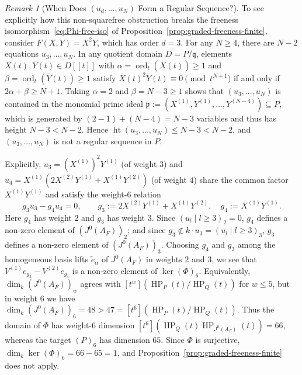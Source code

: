 \documentclass[a4paper, 12pt]{amsart}
\theoremstyle{remark}
\newtheorem{remark}[theorem]{Remark}
\begin{document}
\begin{remark}[When Does $(u_d, \dots, u_N)$ Form a Regular Sequence?]
To see explicitly how this non-squarefree obstruction breaks the freeness isomorphism~\eqref{eq:Phi-free-iso} of Proposition~\ref{prop:graded-freeness-finite},
consider $F(X, Y) = X^2 Y$,
which has order $d = 3$.
For any $N \ge 4$,
there are $N - 2$ equations $u_3, \dots, u_N$.
In any quotient domain $D = P / \mathfrak{q}$,
elements $\overline{X}(t), \overline{Y}(t) \in D[[t]]$ with $\alpha = \operatorname{ord}_t(\overline{X}(t)) \ge 1$ and $\beta = \operatorname{ord}_t(\overline{Y}(t)) \ge 1$
satisfy $\overline{X}(t)^2 \overline{Y}(t) \equiv 0 \pmod{t^{N + 1}}$ if and only if $2\alpha + \beta \ge N + 1$.
Taking $\alpha = 2$ and $\beta = N - 3 \ge 1$ shows that $(u_3, \dots, u_N)$ is contained in the monomial prime ideal $\mathfrak{p} := (X^{(1)}, Y^{(1)}, \dots, Y^{(N - 4)}) \subseteq P$,
which is generated by $(2 - 1) + (N - 4) = N - 3$ variables and thus has height $N - 3 < N - 2$.
Hence $\operatorname{ht}(u_3, \dots, u_N) \le N - 3 < N - 2$,
and $(u_3, \dots, u_N)$ is not a regular sequence in $P$.

Explicitly,
$u_3 = (X^{(1)})^2 Y^{(1)}$ (of weight $3$) and $u_4 = X^{(1)}(2X^{(2)}Y^{(1)} + X^{(1)}Y^{(2)})$ (of weight $4$) share the common factor $X^{(1)}Y^{(1)}$ and satisfy the weight-$6$ relation
\begin{equation*}
  g_3 u_3 - g_4 u_4 = 0, \qquad
  g_3 := 2X^{(2)}Y^{(1)} + X^{(1)}Y^{(2)}, \quad
  g_4 := X^{(1)}Y^{(1)}.
\end{equation*}
Here $g_4$ has weight $2$ and $g_3$ has weight $3$.
Since $(u_l \mid l \ge 3)_2 = 0$,
$g_4$ defines a non-zero element of $\left(J^0(A_F)\right)_2$;
and since $g_3 \notin k \cdot u_3 = (u_l \mid l \ge 3)_3$,
$g_3$ defines a non-zero element of $\left(J^0(A_F)\right)_3$.
Choosing $g_4$ and $g_3$ among the homogeneous basis lifts $\tilde{e}_\alpha$ of $J^0(A_F)$ in weights $2$ and $3$,
we see that $V^{(1)} e_{g_3} - V^{(2)} e_{g_4}$ is a non-zero element of $\ker(\Phi)_6$.
Equivalently,
$\dim_k\left(J^0(A_F)\right)_w$ agrees with $[t^w](\operatorname{HP}_{P}(t)/\operatorname{HP}_{Q}(t))$ for $w \le 5$,
but in weight $6$ we have $\dim_k\left(J^0(A_F)\right)_6 = 48 > 47 = [t^6](\operatorname{HP}_{P}(t)/\operatorname{HP}_{Q}(t))$.
Thus the domain of $\Phi$ has weight-$6$ dimension $[t^6]\left(\operatorname{HP}_{Q}(t)\operatorname{HP}_{J^0(A_F)}(t)\right) = 66$,
whereas the target $(P)_6$ has dimension $65$.
Since $\Phi$ is surjective,
$\dim_k \ker(\Phi)_6 = 66 - 65 = 1$,
and Proposition~\ref{prop:graded-freeness-finite} does not apply.
\end{remark}
\end{document}
